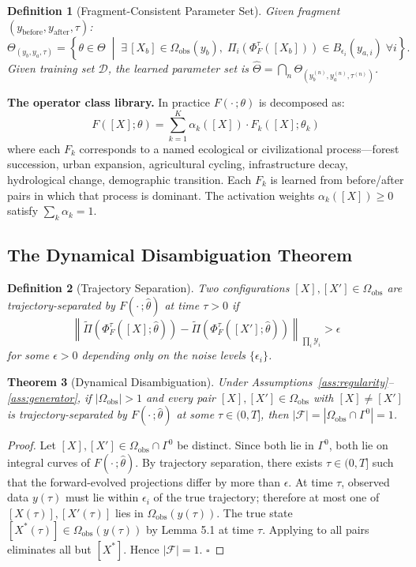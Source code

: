 \documentclass[11pt, oneside]{article}
\newtheorem{theorem}{Theorem}[section]
\newtheorem{definition}[theorem]{Definition}
\newcommand{\Ftil}{\widetilde{\Pi}}
\begin{document}
\begin{definition}[Fragment-Consistent Parameter Set]
Given fragment $(y_{\mathrm{before}}, y_{\mathrm{after}}, \tau)$:
\[
\Theta_{(y_b,y_a,\tau)} = \left\{ \theta \in \Theta \;\middle|\;
\exists\, [X_b] \in \Omega_{\mathrm{obs}}(y_b),\;
\Pi_i(\Phi^\tau_F([X_b])) \in B_{\epsilon_i}(y_{a,i})\; \forall i \right\}.
\]
Given training set $\mathcal{D}$, the learned parameter set is
$\hat{\Theta} = \bigcap_{n} \Theta_{(y_b^{(n)}, y_a^{(n)}, \tau^{(n)})}$.
\end{definition}

\textbf{The operator class library.} In practice $F(\cdot\,;\theta)$ is decomposed as:
\[
F([X];\theta) = \sum_{k=1}^K \alpha_k([X]) \cdot F_k([X];\theta_k)
\]
where each $F_k$ corresponds to a named ecological or civilizational process---forest
succession, urban expansion, agricultural cycling, infrastructure decay, hydrological
change, demographic transition. Each $F_k$ is learned from before/after pairs in which
that process is dominant. The activation weights $\alpha_k([X]) \ge 0$ satisfy
$\sum_k \alpha_k = 1$.

\subsection{The Dynamical Disambiguation Theorem}

\begin{definition}[Trajectory Separation]
Two configurations $[X],[X'] \in \Omega_{\mathrm{obs}}$ are \emph{trajectory-separated} by
$F(\cdot\,;\hat{\theta})$ at time $\tau > 0$ if
\[
\left\| \Ftil(\Phi^\tau_F([X];\hat{\theta})) - \Ftil(\Phi^\tau_F([X'];\hat{\theta}))
\right\|_{\prod_i \mathcal{Y}_i} > \epsilon
\]
for some $\epsilon > 0$ depending only on the noise levels $\{\epsilon_i\}$.
\end{definition}

\begin{theorem}[Dynamical Disambiguation]
\label{thm:disambiguation}
Under Assumptions~\ref{ass:regularity}--\ref{ass:generator}, if $|\Omega_{\mathrm{obs}}| > 1$
and every pair $[X],[X'] \in \Omega_{\mathrm{obs}}$ with $[X] \ne [X']$ is
trajectory-separated by $F(\cdot\,;\hat{\theta})$ at some $\tau \in (0,T]$, then
$|\mathcal{F}| = |\Omega_{\mathrm{obs}} \cap \Gamma^0| = 1$.
\end{theorem}

\begin{proof}
Let $[X],[X'] \in \Omega_{\mathrm{obs}} \cap \Gamma^0$ be distinct. Since both lie in
$\Gamma^0$, both lie on integral curves of $F(\cdot\,;\hat{\theta})$. By trajectory
separation, there exists $\tau \in (0,T]$ such that the forward-evolved projections differ
by more than $\epsilon$. At time $\tau$, observed data $y(\tau)$ must lie within $\epsilon_i$
of the true trajectory; therefore at most one of $[X(\tau)],[X'(\tau)]$ lies in
$\Omega_{\mathrm{obs}}(y(\tau))$. The true state $[X^*(\tau)] \in \Omega_{\mathrm{obs}}(y(\tau))$
by Lemma 5.1 at time $\tau$. Applying to all pairs eliminates all but $[X^*]$.
Hence $|\mathcal{F}| = 1$. $\square$
\end{proof}
\end{document}
